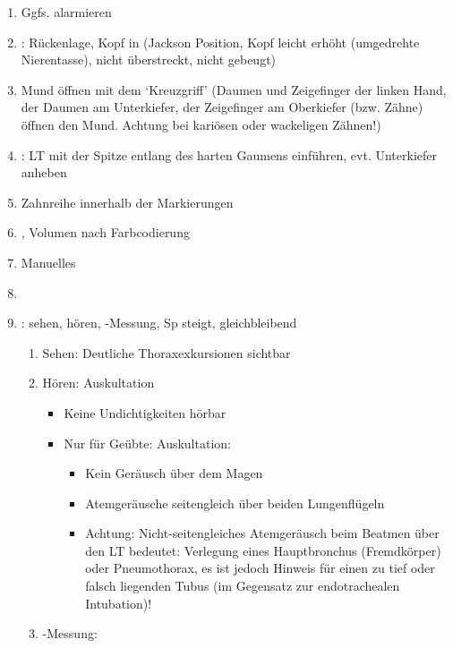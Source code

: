{%
\begin{enumerate}\CorrectionListsBox
  \item Ggfs.  alarmieren
  \item {}: Rückenlage, Kopf in
   (Jackson Position, Kopf
  leicht erhöht (umgedrehte Nierentasse), nicht überstreckt,
  nicht gebeugt)
  \item Mund öffnen mit dem
  \enquote*{Kreuzgriff} (Daumen und Zeigefinger der linken
  Hand, der Daumen am Unterkiefer, der Zeigefinger am
  Oberkiefer (bzw. Zähne) öffnen den Mund. Achtung bei
  kariösen oder wackeligen Zähnen!)
  \item {}: LT mit der Spitze
  entlang des harten Gaumens einführen, evt. Unterkiefer
  anheben
  \item Zahnreihe innerhalb der Markierungen
  \item
  , Volumen nach Farbcodierung
  \item Manuelles
  \item {}
  \item {}: sehen,
  hören, -Messung, Sp steigt, gleichbleibend
  \begin{enumerate}
    \item Sehen: Deutliche Thoraxexkursionen sichtbar
    \item Hören: Auskultation
    \begin{itemize}
      \item Keine Undichtigkeiten hörbar
      \item Nur für Geübte: Auskultation:
      \begin{itemize}
        \item Kein Geräusch über dem Magen
        \item Atemgeräusche seitengleich über beiden Lungenflügeln
        \item Achtung: 
        Nicht-seitengleiches Atemgeräusch beim
        Beatmen über den LT bedeutet: 
        Verlegung eines Hauptbronchus (Fremdkörper) 
        oder Pneumothorax, 
        es ist jedoch  Hinweis für einen zu tief 
        oder falsch
        liegenden Tubus 
        (im Gegensatz zur endotrachealen Intubation)!
      \end{itemize}
    \end{itemize}
    \item {}-Messung: 

\end{enumerate}
\end{enumerate}}
